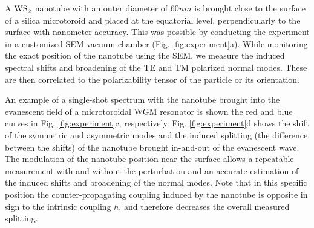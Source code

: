 \documentclass[journal=jacsat,manuscript=article]{achemso}
\begin{document}
A $\ce{WS_2}$ nanotube with an outer diameter of $60nm$ is brought close to the surface of a silica microtoroid and placed at the equatorial level, perpendicularly to the surface with nanometer accuracy. This was possible by conducting the experiment in a customized SEM vacuum chamber (Fig. \ref{fig:experiment}a).
While monitoring the exact position of the nanotube using the SEM, we measure the induced spectral shifts and broadening of the TE and TM polarized normal modes. These are then correlated to the polarizability tensor of the particle or its orientation.

An example of a single-shot spectrum with the nanotube brought into the evanescent field of a microtoroidal WGM resonator is shown the red and blue curves in Fig. \ref{fig:experiment}c, respectively. Fig. \ref{fig:experiment}d shows the shift of the symmetric and asymmetric modes and the induced splitting (the difference between the shifts) of the nanotube brought in-and-out of the evanescent wave. The modulation of the nanotube position near the surface allows a repeatable measurement with and without the perturbation and an accurate estimation of the induced shifts and broadening of the normal modes. Note that in this specific position the counter-propagating coupling induced by the nanotube is opposite in sign to the intrinsic coupling $h$, and therefore decreases the overall measured splitting.
\end{document}

